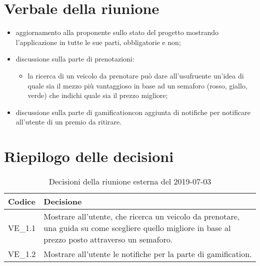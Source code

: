\section{Verbale della riunione}
\begin{itemize}
	\item aggiornamento alla proponente sullo stato del progetto mostrando l'applicazione in tutte le sue parti, obbligatorie e non;
	\item discussione sulla parte di prenotazioni:
	\begin{itemize}
		\item la ricerca di un veicolo da prenotare può dare all'usufruente un'idea di quale sia il mezzo più vantaggioso in base ad un semaforo (rosso, giallo, verde) che indichi quale sia il prezzo migliore; 
	\end{itemize}
	\item discussione sulla parte di gamification\glosp con aggiunta di notifiche per notificare all'utente di un premio da ritirare.
\end{itemize}	 

\section{Riepilogo delle decisioni}

	
	\begin{longtable}{ >{\centering}p{} >{}p{}}
		\caption{Decisioni della riunione esterna del 2019-07-03}\\	
		\rowcolorhead
		\textbf{\color{white}Codice} 
		& \centering\textbf{\color{white}Decisione} 
		\tabularnewline 
		\endfirsthead
		VE\_1.1 & Mostrare all'utente, che ricerca un veicolo da prenotare, una guida su come scegliere quello migliore in base al prezzo posto attraverso un semaforo.
		
		\tabularnewline 
		VE\_1.2 & Mostrare all'utente le notifiche per la parte di gamification\glo.
	\end{longtable}
	




